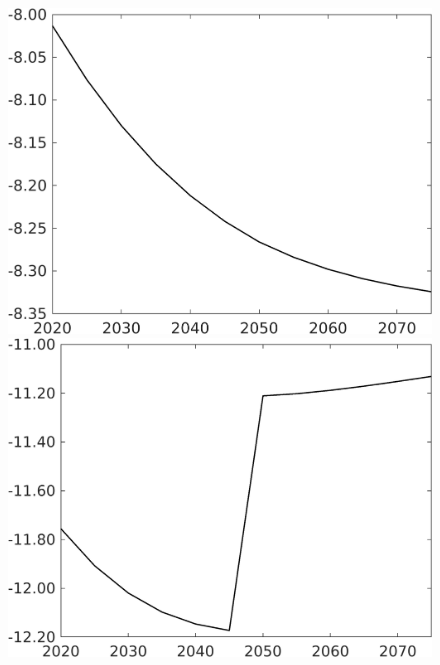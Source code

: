 \documentclass[12pt]{article}
\begin{document}
\begin{figure}[h!!]
\begin{minipage}[]{0.32\textwidth}
	\end{minipage}
	\begin{minipage}[]{0.32\textwidth}
		\includegraphics[width=1\textwidth]{../../codding_model/own_basedOnFried/optimalPol_010922_revision/figures/all_13Sept22/CompTaufPER_bytaul_Equlab_Reg0_Ln_spillover0_nsk0_xgr0_knspil1_sep0_LFlimit1_emsbase0_countec0_GovRev0_etaa0.79_lgd0.png}
	\end{minipage}			
	\begin{minipage}[]{0.32\textwidth}
		\includegraphics[width=1\textwidth]{../../codding_model/own_basedOnFried/optimalPol_010922_revision/figures/all_13Sept22/CompTaufPER_bytaul_Equlab_Reg0_GFF_spillover0_nsk0_xgr0_knspil1_sep0_LFlimit1_emsbase0_countec0_GovRev0_etaa0.79_lgd0.png}

\end{minipage}
\end{figure}
\end{document}
